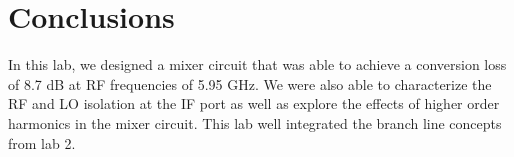 \documentclass[twocolumn, aps, floatfix]{revtex4-1}
\begin{document}
\section*{Conclusions}
In this lab, we designed a mixer circuit that was able to achieve a conversion loss of 8.7 dB at RF frequencies of 5.95 GHz. We were also able to characterize the RF and LO isolation at the IF port as well as explore the effects of higher order harmonics in the mixer circuit. This lab well integrated the branch line concepts from lab 2.
\end{document}

